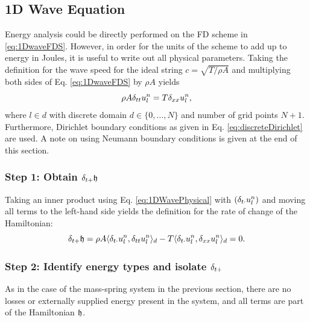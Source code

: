 {{\subsection{1D Wave Equation}\label{sec:1DWaveEnergyAnalysis}
Energy analysis could be directly performed on the FD scheme in \eqref{eq:1DwaveFDS}. However, in order for the units of the scheme to add up to energy in Joules, it is useful to write out all physical parameters. Taking the definition for the wave speed for the ideal string $c = \sqrt{T/\rho A}$ and multiplying both sides of Eq. \eqref{eq:1DwaveFDS} by $\rho A$ yields
\begin{equation}\label{eq:1DWavePhysical}
    \rho A \delta_{tt} u_l^n = T \delta_{xx} u_l^n,
\end{equation}
where $l\in d$ with discrete domain $d\in\{0, \hdots, N\}$ and number of grid points $N+1$. Furthermore, Dirichlet boundary conditions as given in Eq. \eqref{eq:discreteDirichlet} are used. A note on using Neumann boundary conditions is given at the end of this section.

\subsubsection{Step 1: Obtain $\delta_{t+} \mathfrak{h}$}
Taking an inner product using Eq. \eqref{eq:1DWavePhysical} with $\left( \delta_{t\cdot} u_l^n \right)$ and moving all terms to the left-hand side yields the definition for the rate of change of the Hamiltonian:
\begin{equation}\label{eq:rOC1DWave}
    \delta_{t+} \mathfrak{h} = \rho A \langle \delta_{t\cdot} u_l^n, \delta_{tt} u_l^n \rangle_d - T \langle \delta_{t\cdot}u_l^n, \delta_{xx} u_l^n\rangle_d = 0.
\end{equation}


\subsubsection{Step 2: Identify energy types and isolate $\delta_{t+}$}
As in the case of the mass-spring system in the previous section, there are no losses or externally supplied energy present in the system, and all terms are part of the Hamiltonian $\mathfrak{h}$.

}}
